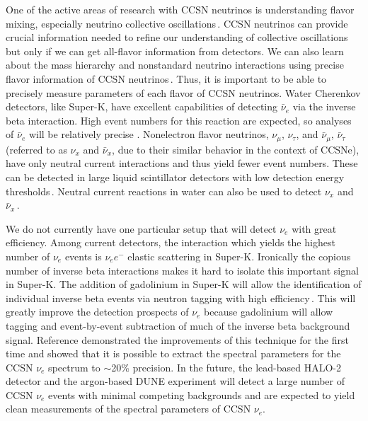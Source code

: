 \documentclass[aps,reprint,superscriptaddress]{revtex4-1}
\begin{document}
One of the active areas of research with CCSN neutrinos is understanding flavor mixing, especially neutrino collective oscillations\,\cite{Dighe:1999bi,Dighe:2007ks,Duan:2010bg,Cherry:2011fm,Cherry:2011fn,Tamborra:2013laa,Raffelt:2013isa,Mirizzi:2015eza,Dasgupta:2015iia,Chakraborty:2016lct,Izaguirre:2016gsx,Akhmedov:2016gzx,Armstrong:2016mnt,Capozzi:2016oyk,Johns:2016wjd,Chakraborty:2016yeg,Tamborra:2017ubu,Capozzi:2017gqd,Sasaki:2017jry,Akhmedov:2017mcc,Dasgupta:2017oko}. CCSN neutrinos can provide crucial information needed to refine our understanding of collective oscillations but only if we can get all-flavor information from detectors.  We can also learn about the mass hierarchy and nonstandard neutrino interactions using precise flavor information of CCSN neutrinos\,\cite{Mirizzi:2015eza,Lai:2016yvu,Stapleford:2016jgz,Das:2017iuj,Dighe:2017sur}.  Thus, it is important to be able to precisely measure parameters of each flavor of CCSN neutrinos.  Water Cherenkov detectors, like Super-K, have excellent capabilities of detecting $\bar{\nu}_{e}$ via the inverse beta interaction. High event numbers for this reaction are expected, so analyses of $\bar{\nu}_{e}$ will be relatively precise \cite{Scholberg:2012id}.  Nonelectron flavor neutrinos, $\nu_{\mu}$, $\nu_{\tau}$, and $\bar{\nu}_\mu$, $\bar{\nu}_\tau$ (referred to as $\nu_{x}$ and $\bar{\nu}_x$, due to their similar behavior in the context of CCSNe), have only neutral current interactions and thus yield fewer event numbers.  These can be detected in large liquid scintillator detectors with low detection energy thresholds\,\cite{Beacom:2002hs,Dasgupta:2011wg,Lujan-Peschard:2014lta}.  Neutral current reactions in water can also be used to detect $\nu_x$ and $\bar{\nu}_x$\,\cite{Langanke:1995he}.

We do not currently have one particular setup that will detect $\nu_{e}$ with great efficiency.  Among current detectors, the interaction which yields the highest number of $\nu_e$ events is $\nu_e e^-$ elastic scattering in Super-K.  Ironically the copious number of inverse beta interactions makes it hard to isolate this important signal in Super-K.  The addition of gadolinium in Super-K will allow the identification of individual inverse beta events via neutron tagging with high efficiency\,\cite{Beacom:2003nk,Sekiya:2017lgj}.  This will greatly improve the detection prospects of $\nu_{e}$ because gadolinium will allow tagging and event-by-event subtraction of much of the inverse beta background signal. Reference \cite{Laha:2013hva} demonstrated the improvements of this technique for the first time and showed that it is possible to extract the spectral parameters for the CCSN $\nu_{e}$ spectrum to $\sim$20\% precision.  In the future, the lead-based HALO-2 detector \cite{Duba:2008zz,Vaananen:2011bf} and the argon-based DUNE experiment \cite{Acciarri:2015uup,Ankowski:2016lab,Acciarri:2016ooe,Kemp:2017kbm} will detect a large number of CCSN $\nu_e$ events with minimal competing backgrounds and are expected to yield clean measurements of the spectral parameters of CCSN $\nu_e$.
\end{document}
